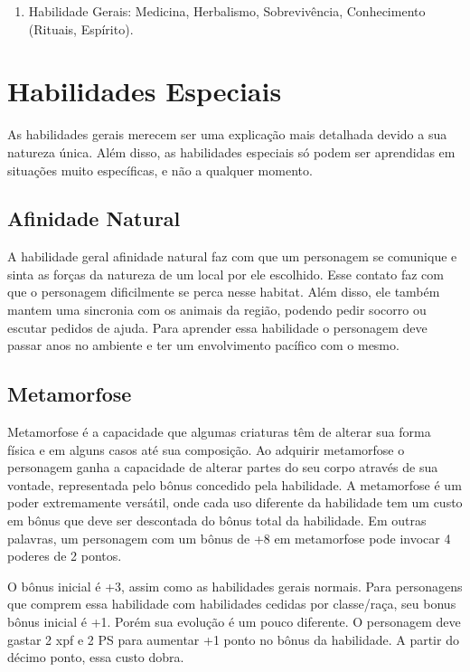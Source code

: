 \begin{enumerate}


\item Habilidade Gerais: Medicina, Herbalismo, Sobrevivência, Conhecimento (Rituais, Espírito).


\end{enumerate}

\section{Habilidades Especiais}

As habilidades gerais merecem ser uma explicação mais detalhada devido a sua natureza única. Além disso, as habilidades especiais só podem ser aprendidas em situações muito específicas, e não a qualquer momento.

\subsection{Afinidade Natural}
 A habilidade geral afinidade natural faz com que um personagem se comunique e sinta as forças da natureza de um local por ele escolhido. Esse contato faz com que o personagem dificilmente se perca nesse habitat. Além disso, ele também mantem uma sincronia com os animais da região, podendo pedir socorro ou escutar pedidos de ajuda. Para aprender essa habilidade o personagem deve passar anos no ambiente e ter um envolvimento pacífico com o mesmo.
 
 
 \subsection{Metamorfose}
 
 Metamorfose é a capacidade que algumas criaturas têm de alterar sua forma física e em alguns casos até sua composição. Ao adquirir metamorfose o personagem ganha a capacidade de alterar partes do seu corpo através de sua vontade, representada pelo bônus concedido pela habilidade. A metamorfose é um poder extremamente versátil, onde cada uso diferente da habilidade tem um custo em bônus que deve ser descontada do bônus total da habilidade. Em outras palavras, um personagem com um bônus de +8 em metamorfose pode invocar 4 poderes de 2 pontos. 

O bônus inicial é +3, assim como as habilidades gerais normais. Para personagens que comprem essa habilidade com habilidades cedidas por classe/raça, seu bonus bônus inicial é +1. Porém sua evolução é um pouco diferente. O personagem deve gastar 2 xpf e 2 PS para aumentar +1 ponto no bônus da habilidade. A partir do décimo ponto, essa custo dobra.

